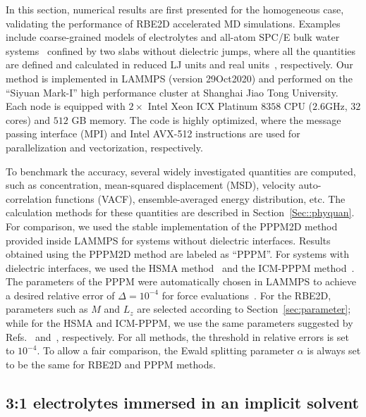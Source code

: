 In this section, numerical results are first presented for the homogeneous case, validating the performance of RBE2D accelerated MD simulations. 
Examples include coarse-grained models of electrolytes and all-atom SPC/E bulk water systems~\cite{berendsen1987missing} confined by two slabs without dielectric jumps, where all the quantities are defined and calculated in reduced LJ units and real units~\cite{frenkel2023understanding}, respectively.
Our method is implemented in LAMMPS (version 29Oct2020) \cite{thompson2021lammps} and performed on the ``Siyuan Mark-I'' high performance cluster at Shanghai Jiao Tong University. 
Each node is equipped with $2\times$ Intel Xeon ICX Platinum $8358$ CPU ($2.6$GHz, $32$ cores) and $512$ GB memory.
The code is highly optimized, where the message passing interface (MPI) and Intel AVX-512 instructions are used for parallelization and vectorization, respectively.

To benchmark the accuracy, several widely investigated quantities are computed, such as concentration, mean-squared displacement (MSD), velocity auto-correlation functions (VACF), ensemble-averaged energy distribution, etc. 
The calculation methods for these quantities are described in Section~\ref{Sec::phyquan}.
For comparison, we used the stable implementation of the PPPM2D method~\cite{crozier2001molecular} provided inside LAMMPS for systems without dielectric interfaces.
Results obtained using the PPPM2D method are labeled as ``PPPM''. 
For systems with dielectric interfaces, we used the HSMA method~\cite{liang2020harmonic} and the ICM-PPPM method~\cite{yuan2021particle}.
The parameters of the PPPM were automatically chosen in LAMMPS to achieve a desired relative error of $\Delta=10^{-4}$ for force evaluations~\cite{deserno1998mesh}. 
For the RBE2D, parameters such as $M$ and $L_z$ are selected according to Section~\ref{sec:parameter}; while
for the HSMA and ICM-PPPM, we use the same parameters suggested by Refs.~\cite{liang2020harmonic} and~\cite{yuan2021particle}, respectively. For all methods, the threshold in relative errors is set to $10^{-4}$.
To allow a fair comparison, the Ewald splitting parameter $\alpha$ is always set to be the same for RBE2D and PPPM methods.



\subsection{3:1 electrolytes immersed in an implicit solvent}\label{subsec::electrolyte-neutral}

